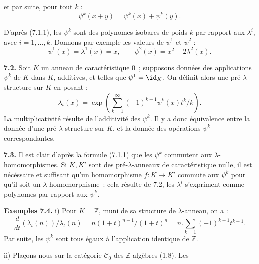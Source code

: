 et par
suite, pour tout \(k\) :
\[
  \psi^k(x+y)=\psi^k(x)+\psi^k(y).
\]

D'après (7.1.1), les \(\psi^k\) sont des polynomes isobares de poids \(k\) par rapport aux \(\lambda^i\), avec \(i=1,\ldots,k\). Donnons par exemple les valeurs de \(\psi^1\) et \(\psi^2\) :
\[
  \psi^1(x)=\lambda^1(x)=x,
  \qquad
  \psi^2(x)=x^2-2\lambda^2(x).
\]

\textbf{7.2.} Soit \(K\) un anneau de caractéristique \(0\)~; supposons données des applications \(\psi^k\) de \(K\) dans \(K\), additives, et telles que \(\psi^1=\id_K\). On définit alors une pré-\(\lambda\)-structure sur \(K\) en posant :
\begin{equation}\tag{7.2.1}
  \lambda_t(x)=
  \exp\left(\sum_{k=1}^{\infty}(-1)^{k-1}\psi^k(x)t^k/k\right).
\end{equation}
La multiplicativité résulte de l'additivité des \(\psi^k\). Il y a donc équivalence entre la donnée d'une pré-\(\lambda\)-structure sur \(K\), et la donnée des opérations \(\psi^k\) correspondantes.

\textbf{7.3.} Il est clair d'après la formule (7.1.1) que les \(\psi^k\) commutent aux \(\lambda\)-homomorphismes. Si \(K,K'\) sont des pré-\(\lambda\)-anneaux de caractéristique nulle, il est nécéssaire et suffisant qu'un homomorphisme \(f:K\to K'\) commute aux \(\psi^k\) pour qu'il soit un \(\lambda\)-homomorphisme~: cela résulte de 7.2, les \(\lambda^i\) s'expriment comme polynomes par rapport aux \(\psi^k\).

\textbf{Exemples 7.4.} i) Pour \(K=\mathbb Z\), muni de sa structure de \(\lambda\)-anneau, on a :
\[
  \frac{d}{dt}(\lambda_t(n))/\lambda_t(n)
  =
  n(1+t)^{n-1}/(1+t)^n
  =
  n.\sum_{k=1}(-1)^{k-1}t^{k-1}.
\]
Par suite, les \(\psi^k\) sont tous égaux à l'application identique de \(\mathbb Z\).

ii) Plaçons nous sur la catégorie \(\mathcal C_0\) des \(\mathbb Z\)-algèbres (1.8). Les 
